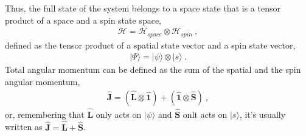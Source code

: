 \documentclass[letterpaper,10pt,english]{jupyterBook}
\begin{document}
\sphinxAtStartPar
Thus, the full state of the system belongs to a space state that is a tensor product of a space and a spin state space,
\begin{equation*}
\begin{split}\mathcal{H} = \mathcal{H}_{space} \otimes \mathcal{H}_{spin} \ ,\end{split}
\end{equation*}
\sphinxAtStartPar
defined as the tensor product of a spatial state vector and a spin state vector,
\begin{equation*}
\begin{split}| \Psi \rangle = | \psi \rangle \otimes | s \rangle \ .\end{split}
\end{equation*}
\sphinxAtStartPar
{} Total angular momentum can be defined as the sum of the spatial and the spin angular momentum,
\begin{equation*}
\begin{split}\hat{\mathbf{J}} = \left( \hat{\mathbf{L}} \otimes \hat{\mathbf{1}} \right) + \left( \hat{\mathbf{1}} \otimes \hat{\mathbf{S}} \right) \ ,\end{split}
\end{equation*}
\sphinxAtStartPar
or, remembering that \(\hat{\mathbf{L}}\) only acts on \(| \psi \rangle\) and \(\hat{\mathbf{S}}\) onlt acts on \(| s \rangle\), it’s usually written as \(\hat{\mathbf{J}} = \hat{\mathbf{L}} + \hat{\mathbf{S}}\).

\sphinxstepscope
\end{document}
